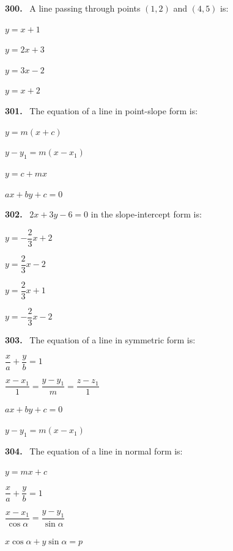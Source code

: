 \documentclass[11pt]{article}
\newenvironment{qenv}[1]{%
  \par\medskip\noindent\textbf{#1.}\ \ignorespaces
}{\par}
\begin{document}
\begin{qenv}{300} A line passing through points $(1,2)$ and $(4,5)$ is:
\begin{options} \item $y=x+1$ \item $y=2x+3$ \item $y=3x-2$ \item $y=x+2$ \end{options} \end{qenv}

\begin{qenv}{301} The equation of a line in point-slope form is:
\begin{options} \item $y=m(x+c)$ \item $y-y_1=m(x-x_1)$ \item $y=c+mx$ \item $ax+by+c=0$ \end{options} \end{qenv}

\begin{qenv}{302} $2x+3y-6=0$ in the slope-intercept form is:
\begin{options} \item $y=-\dfrac{2}{3}x+2$ \item $y=\dfrac{2}{3}x-2$ \item $y=\dfrac{2}{3}x+1$ \item $y=-\dfrac{2}{3}x-2$ \end{options} \end{qenv}

\begin{qenv}{303} The equation of a line in symmetric form is:
\begin{options} \item $\dfrac{x}{a}+\dfrac{y}{b}=1$ \item $\dfrac{x-x_1}{1}=\dfrac{y-y_1}{m}=\dfrac{z-z_1}{1}$ \item $ax+by+c=0$ \item $y-y_1=m(x-x_1)$ \end{options} \end{qenv}

\begin{qenv}{304} The equation of a line in normal form is:
\begin{options} \item $y=mx+c$ \item $\dfrac{x}{a}+\dfrac{y}{b}=1$ \item $\dfrac{x-x_1}{\cos\alpha}=\dfrac{y-y_1}{\sin\alpha}$ \item $x\cos\alpha+y\sin\alpha=p$ \end{options} \end{qenv}
\end{document}
